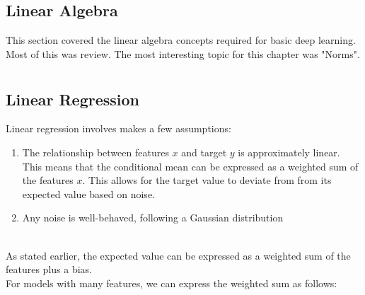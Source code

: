 \documentclass{report}
\begin{document}
\section{Linear Algebra}

This section covered the linear algebra concepts required for basic deep learning. Most of this was review. The most interesting topic for this chapter was "Norms". 



\chapter{}
\section{Linear Regression}

\noindent Linear regression involves makes a few assumptions: 
\begin{enumerate}
    \item The relationship between features $x$ and target $y$ is approximately linear. This means that the conditional mean can be expressed as a weighted sum of the features $x$. This allows for the target value to deviate from from its expected value based on noise.
    \item Any noise is well-behaved, following a Gaussian distribution
\end{enumerate}

\\

As stated earlier, the expected value can be expressed as a weighted sum of the features plus a bias. 
\\

For models with many features, we can express the weighted sum as follows: 
\end{document}
